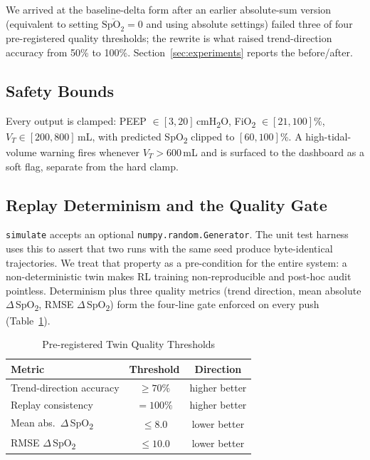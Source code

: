 \documentclass[conference]{IEEEtran}
\begin{document}
We arrived at the baseline-delta form after an earlier absolute-sum version (equivalent to setting $\overline{\text{SpO}_2}=0$ and using absolute settings) failed three of four pre-registered quality thresholds; the rewrite is what raised trend-direction accuracy from 50\% to 100\%. Section~\ref{sec:experiments} reports the before/after.

\subsection{Safety Bounds}
Every output is clamped: PEEP $\in [3,20]$\,cmH\textsubscript{2}O, FiO\textsubscript{2} $\in [21,100]$\%, $V_T \in [200,800]$\,mL, with predicted SpO\textsubscript{2} clipped to $[60,100]$\%. A high-tidal-volume warning fires whenever $V_T > 600$\,mL and is surfaced to the dashboard as a soft flag, separate from the hard clamp.

\subsection{Replay Determinism and the Quality Gate}
\texttt{simulate} accepts an optional \texttt{numpy.random.Generator}. The unit test harness uses this to assert that two runs with the same seed produce byte-identical trajectories. We treat that property as a pre-condition for the entire system: a non-deterministic twin makes RL training non-reproducible and post-hoc audit pointless. Determinism plus three quality metrics (trend direction, mean absolute $\Delta$\,SpO\textsubscript{2}, RMSE $\Delta$\,SpO\textsubscript{2}) form the four-line gate enforced on every push (Table~\ref{tab:gates}).

\begin{table}[h]
\centering
\caption{Pre-registered Twin Quality Thresholds}
\label{tab:gates}
\renewcommand{\arraystretch}{1.15}
\begin{tabular}{lcc}
\toprule
\textbf{Metric}                        & \textbf{Threshold} & \textbf{Direction}\\
\midrule
Trend-direction accuracy               & $\ge 70\%$         & higher better\\
Replay consistency                     & $= 100\%$          & higher better\\
Mean abs.\ $\Delta$\,SpO\textsubscript{2} & $\le 8.0$       & lower better\\
RMSE $\Delta$\,SpO\textsubscript{2}    & $\le 10.0$         & lower better\\
\bottomrule
\end{tabular}
\end{table}
\end{document}
